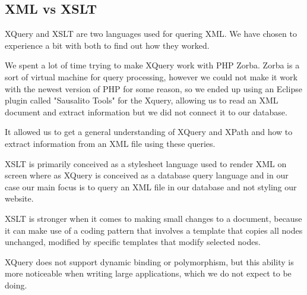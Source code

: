 \subsection{XML vs XSLT}

XQuery and XSLT are two languages used for quering XML. We have chosen to experience a bit with both  to find out how they worked.

We spent a lot of time trying to make XQuery work with PHP Zorba. Zorba is a sort of virtual machine for query processing, however we could not make it work with the newest version of PHP for some reason, so we ended up using an Eclipse plugin called  "Sausalito Tools" for the Xquery, allowing us to read an XML document and extract information but we did not connect it to our database. 

It allowed us to get a general understanding of XQuery and XPath and how to extract information from an XML file using these queries. 

XSLT is primarily conceived as a stylesheet language used to render XML on screen where as XQuery is conceived as a database query language and in our case our main focus is to query an XML file in our database and not styling our website. 

XSLT is stronger when it comes to making small changes to a document, because it can make use of a coding pattern that involves a template that copies all nodes unchanged, modified by specific templates that modify selected nodes.

XQuery does not support dynamic binding or polymorphism, but this ability is more noticeable when writing large applications, which we do not expect to be doing. 
